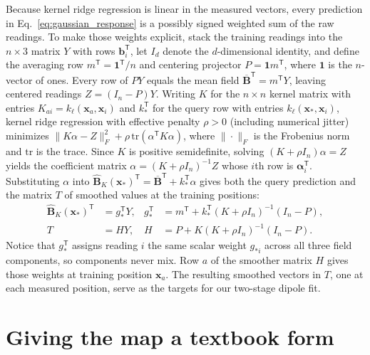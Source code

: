 \documentclass[11pt]{article}
\newcommand{\B}{\mathbf B}
\newcommand{\x}{\mathbf x}
\newcommand{\bvec}{\mathbf b}
\begin{document}
Because kernel ridge regression is linear in the measured vectors, every
prediction in Eq.~\eqref{eq:gaussian_response} is a possibly signed weighted sum of
the raw readings. To make those weights explicit, stack the training readings
into the \(n\times3\) matrix \(Y\) with rows \(\bvec_i^{\mathsf T}\), let
\(I_d\) denote the \(d\)-dimensional identity, and define the averaging row
\(m^{\mathsf T}=\mathbf1^{\mathsf T}/n\) and centering projector
\(P=\mathbf1 m^{\mathsf T}\), where \(\mathbf1\) is the \(n\)-vector of ones.
Every row of \(PY\) equals the mean field \(\overline{\B}^{\mathsf T}=m^{\mathsf T}Y\),
leaving centered readings \(Z=(I_n-P)Y\). Writing \(K\) for the \(n\times n\)
kernel matrix with entries \(K_{ai}=k_\ell(\x_a,\x_i)\) and \(k_*^{\mathsf T}\)
for the query row with entries \(k_\ell(\x_*,\x_i)\), kernel ridge regression
with effective penalty \(\rho>0\) (including numerical jitter) minimizes
\(\|K\alpha-Z\|_F^2+\rho\,\mathrm{tr}(\alpha^{\mathsf T}K\alpha)\), where
\(\|\cdot\|_F\) is the Frobenius norm and \(\mathrm{tr}\) is the trace.
Since \(K\) is positive semidefinite, solving \((K+\rho I_n)\alpha=Z\) yields
the coefficient matrix \(\alpha=(K+\rho I_n)^{-1}Z\) whose \(i\)th row is
\(\boldsymbol\alpha_i^{\mathsf T}\). Substituting \(\alpha\) into
\(\widehat{\B}_K(\x_*)^{\mathsf T}=\overline{\B}^{\mathsf T}+k_*^{\mathsf T}\alpha\)
gives both the query prediction and the matrix \(T\) of smoothed values at the
training positions:
\begin{align}
 \widehat{\B}_K(\x_*)^{\mathsf T}&=g_*^{\mathsf T}Y,
 &g_*^{\mathsf T}&=m^{\mathsf T}+k_*^{\mathsf T}(K+\rho I_n)^{-1}(I_n-P),\\
 T&=HY,
 & H&=P+K(K+\rho I_n)^{-1}(I_n-P).
 \label{eq:teacher}
\end{align}
Notice that \(g_*^{\mathsf T}\) assigns reading \(i\) the same scalar weight
\(g_{*i}\) across all three field components, so components never mix. Row \(a\)
of the smoother matrix \(H\) gives those weights at training position \(\x_a\).
The resulting smoothed vectors in \(T\), one at each measured position, serve
as the targets for our two-stage dipole fit.

\section{Giving the map a textbook form}
\end{document}
